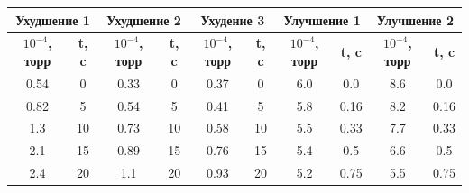 \documentclass[a4paper,12pt]{article} %
\begin{document}
\begin{center}
    \begin{table}
        \begin{tabular}{|c|c|c|c|c|c|c|c|c|c|}
            \hline
            \multicolumn{2}{|c|}{\textbf{Ухудшение 1}} & \multicolumn{2}{|c|}{\textbf{Ухудшение 2}} & \multicolumn{2}{|c|}{\textbf{Ухудение 3}} & \multicolumn{2}{|c|}{\textbf{Улучшение 1}} & \multicolumn{2}{|c|}{\textbf{Улучшение 2}} \\\hline
            \textbf{$10^{-4}$, торр}               & \textbf{t, c}                              & \textbf{$10^{-4}$, торр}              & \textbf{t, c}                              & \textbf{$10^{-4}$, торр} & \textbf{t, c} & \textbf{$10^{-4}$, торр} & \textbf{t, c} & \textbf{$10^{-4}$, торр} & \textbf{t, c} \\ \hline
            0.54                                       & 0                                          & 0.33                                      & 0                                          & 0.37                         & 0             & 6.0                          & 0.0           &  8.6  & 0.0   \\ \hline
            0.82                                       & 5                                          & 0.54                                      & 5                                          & 0.41                         & 5             & 5.8                          & 0.16          &  8.2  & 0.16  \\ \hline
            1.3                                        & 10                                         & 0.73                                      & 10                                         & 0.58                         & 10            & 5.5                          & 0.33          &  7.7  & 0.33  \\ \hline
            2.1                                        & 15                                         & 0.89                                      & 15                                         & 0.76                         & 15            & 5.4                          & 0.5           &  6.6  & 0.5   \\ \hline
            2.4                                        & 20                                         & 1.1                                       & 20                                         & 0.93                         & 20            & 5.2                          & 0.75          &  5.5  & 0.75  \\ \hline

\end{tabular}
\end{table}
\end{center}
\end{document}
